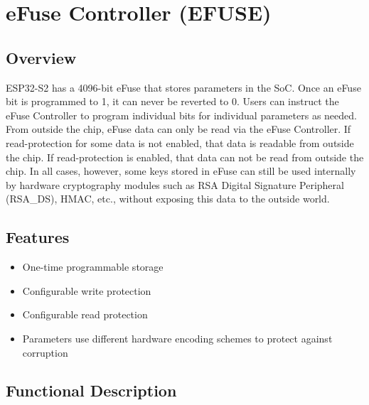 \documentclass[main\_\_EN.tex]{subfiles}
\begin{document}
\setenglishformatting

\ifglobal
\else
    \listoftodos
    {\let\clearpage\relax \listofdonetodos}
    \tableofcontents
\fi




\hypertarget{efuse}{}
\chapter{eFuse Controller (EFUSE)}
\label{mod:efuse}


\section{Overview}

ESP32-S2 has a 4096-bit eFuse that stores parameters in the SoC. Once an eFuse bit is programmed to 1, it can never be reverted to 0. Users can instruct the eFuse Controller to program individual bits for individual parameters as needed. From outside the chip, eFuse data can only be read via the eFuse Controller. If read-protection for some data is not enabled, that data is readable from outside the chip. If read-protection is enabled, that data can not be read from outside the chip. In all cases, however, some keys stored in eFuse can still be used internally by hardware cryptography modules such as RSA Digital Signature Peripheral (RSA\_DS), HMAC, etc., without exposing this data to the outside world.
 \section{Features}

\begin{itemize}
    \item One-time programmable storage
    \item Configurable write protection
    \item Configurable read protection
    \item Parameters use different hardware encoding schemes to protect against corruption
\end{itemize}


\section{Functional Description}
\end{document}
